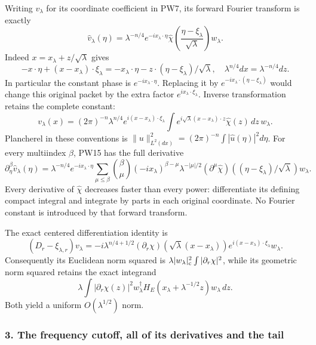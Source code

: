 \documentclass[
  11pt,
]{article}
\makeatletter
\let\ReaderOriginalAnchorStart\hyper@anchorstart
\let\ReaderOriginalAnchorEnd\hyper@anchorend
\let\ReaderPendingAliases\@empty
\def\ReaderArmAliases#1{\gdef\ReaderPendingAliases{#1}}
\def\hyper@anchorstart#1{\ReaderIfNativeAnchorTF{#1}{\ReaderPendingAliases\global\let\ReaderPendingAliases\@empty}{}\ReaderOriginalAnchorStart{#1}}
\makeatother
\begin{document}
Writing \(v_\lambda\) for its coordinate coefficient in PW7, its forward
Fourier transform is exactly \[
 \widehat v_\lambda(\eta)
   =\lambda^{-n/4}e^{-ix_\lambda\cdot\eta}
      \widehat\chi\!\left(
           \frac{\eta-\xi_\lambda}{\sqrt\lambda}\right)w_\lambda .
 \tag{PW15}
\] Indeed \(x=x_\lambda+z/\sqrt\lambda\) gives \[
 -x\cdot\eta+(x-x_\lambda)\cdot\xi_\lambda
 =-x_\lambda\cdot\eta
    -z\cdot(\eta-\xi_\lambda)/\sqrt\lambda ,
 \quad
 \lambda^{n/4}dx=\lambda^{-n/4}dz .
\] In particular the constant phase is \(e^{-ix_\lambda\cdot\eta}\).
Replacing it by \(e^{-ix_\lambda\cdot(\eta-\xi_\lambda)}\) would change
this original packet by the extra factor
\(e^{ix_\lambda\cdot\xi_\lambda}\). Inverse transformation retains the
complete constant: \[
 v_\lambda(x)=
 (2\pi)^{-n}\lambda^{n/4}
 e^{i(x-x_\lambda)\cdot\xi_\lambda}
 \int e^{i\sqrt\lambda(x-x_\lambda)\cdot z}
      \widehat\chi(z)\,dz\,w_\lambda .
 \tag{PW16}
\] Plancherel in these conventions is
\(\|u\|_{L^2(dx)}^2=(2\pi)^{-n}\int|\widehat u(\eta)|^2d\eta\). For
every multiindex \(\beta\), PW15 has the full derivative \[
 \partial_\eta^\beta\widehat v_\lambda(\eta)
 =\lambda^{-n/4}e^{-ix_\lambda\cdot\eta}
   \sum_{\mu\leq\beta}{\beta\choose\mu}
   (-ix_\lambda)^{\beta-\mu}\lambda^{-|\mu|/2}
   (\partial^\mu\widehat\chi)
       ((\eta-\xi_\lambda)/\sqrt\lambda)w_\lambda .
 \tag{PW17}
\] Every derivative of \(\widehat\chi\) decreases faster than every
power: differentiate its defining compact integral and integrate by
parts in each original coordinate. No Fourier constant is introduced by
that forward transform.

The exact centered differentiation identity is \[
 (D_r-\xi_{\lambda,r})v_\lambda
   =-i\lambda^{n/4+1/2}
        (\partial_r\chi)(\sqrt\lambda(x-x_\lambda))
        e^{i(x-x_\lambda)\cdot\xi_\lambda}w_\lambda .
 \tag{PW18}
\] Consequently its Euclidean norm squared is
\(\lambda|w_\lambda|_{\rm c}^2\int|\partial_r\chi|^2\), while its
geometric norm squared retains the exact integrand \[
 \lambda\int|\partial_r\chi(z)|^2
      w_\lambda^\dagger H_E(x_\lambda+\lambda^{-1/2}z)
                   w_\lambda\,dz .
 \tag{PW19}
\] Both yield a uniform \(O(\lambda^{1/2})\) norm.

\ReaderArmAliases{\ReaderOriginalAnchorStart{3-the-frequency-cutoff-all-of-its-derivatives-and-the-tail}\ReaderOriginalAnchorEnd\begingroup\expandafter\def\csname @currentHref\endcsname{3-the-frequency-cutoff-all-of-its-derivatives-and-the-tail}\label{3-the-frequency-cutoff-all-of-its-derivatives-and-the-tail}\endgroup}
\subsubsection{3. The frequency cutoff, all of its derivatives and the
tail}\label{the-frequency-cutoff-all-of-its-derivatives-and-the-tail}
\end{document}
